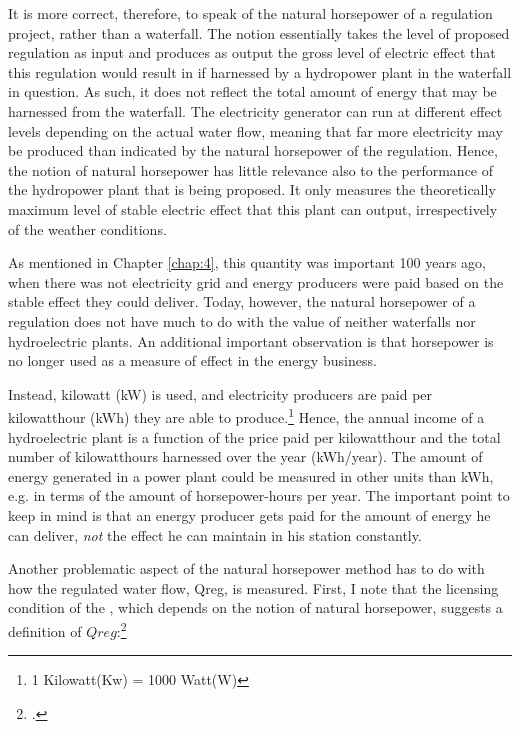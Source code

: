 It is more correct, therefore, to speak of the natural horsepower of a regulation project, rather than a waterfall. The notion essentially takes the level of proposed regulation as input and produces as output the gross level of electric effect that this regulation would result in if harnessed by a hydropower plant in the waterfall in question. As such, it does not reflect the total amount of energy that may be harnessed from the waterfall. The electricity generator can run at different effect levels depending on the actual water flow, meaning that far more electricity may be produced than indicated by the natural horsepower of the regulation. Hence, the notion of natural horsepower has little relevance also to the performance of the hydropower plant that is being proposed. It only measures the theoretically maximum level of stable electric effect that this plant can output, irrespectively of the weather conditions.

As mentioned in Chapter \ref{chap:4}, this quantity was important 100 years ago, when there was not electricity grid and energy producers were paid based on the stable effect they could deliver. Today, however, the natural horsepower of a regulation does not have much to do with the value of neither waterfalls nor hydroelectric plants. An additional important observation is that horsepower is no longer used as a measure of effect in the energy business. 

Instead, kilowatt (kW) is used, and electricity producers are paid per kilowatthour (kWh) they are able to produce.\footnote{1 Kilowatt(Kw) = 1000 Watt(W)} Hence, the annual income of a hydroelectric plant is a function of the price paid per kilowatthour and the total number of kilowatthours harnessed over the year (kWh/year). The amount of energy generated in a power plant could be measured in other units than kWh, e.g. in terms of the amount of horsepower-hours per year. The important point to keep in mind is that an energy producer gets paid for the amount of energy he can deliver, \emph{not} the effect he can maintain in his station constantly. %

Another problematic aspect of the natural horsepower method has to do with how the regulated water flow, Qreg, is measured.
First, I note that the licensing condition of the \cite{wra17}, which depends on the notion of natural horsepower, suggests a definition of $Qreg$:\footcite[2]{wra17}

